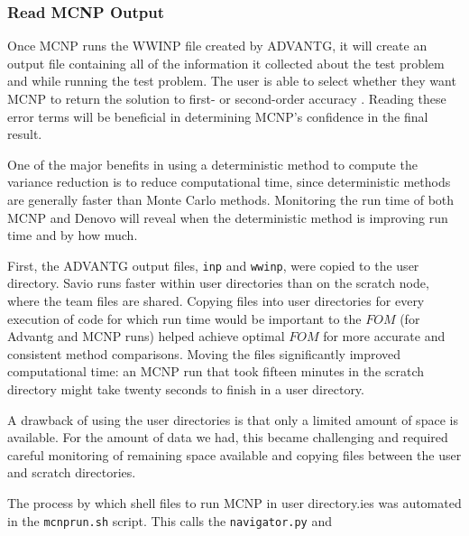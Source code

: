 \documentclass[10pt]{article}
\begin{document}
\subsubsection{Read MCNP Output}
\label{sec:alg:mcnp-out}

Once MCNP runs the WWINP file created by ADVANTG, it will create an output file containing all of the information it collected about the test problem and while running the test problem.
The user is able to select whether they want MCNP to return the solution to first- or second-order accuracy \cite{software:mcnp6}.
Reading these error terms will be beneficial in determining MCNP's confidence in the final result.

One of the major benefits in using a deterministic method to compute the variance reduction is to reduce computational time, since deterministic methods are generally faster than Monte Carlo methods.
Monitoring the run time of both MCNP and Denovo will reveal when the deterministic method is improving run time and by how much.

First, the ADVANTG output files, \texttt{inp} and \texttt{wwinp}, were copied to the user directory.
Savio runs faster within user directories than on the scratch node, where the team files are shared.
Copying files into user directories for every execution of code for which run time would be important to the $FOM$ (for Advantg and MCNP runs) helped achieve optimal $FOM$ for more accurate and consistent method comparisons.
Moving the files significantly improved computational time: an MCNP run that took fifteen minutes in the scratch directory might take twenty seconds to finish in a user directory.

A drawback of using the user directories is that only a limited amount of space is available.
For the amount of data we had, this became challenging and required careful monitoring of remaining space available and copying files between the user and scratch directories.


The process by which shell files to run MCNP in user directory.ies was automated in the \texttt{mcnprun.sh} script.
This calls the \texttt{navigator.py} and \texttt{}

\end{document}
